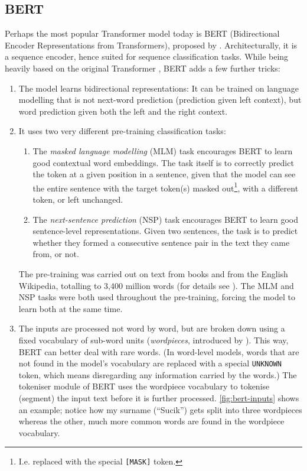 \documentclass[bsc,frontabs,twoside,singlespacing,parskip,deptreport]{infthesis}
\begin{document}
{{    \subsection{BERT}{
      \label{sec:BERT}
      Perhaps the most popular Transformer model today is BERT (Bidirectional Encoder Representations from Transformers), proposed by \citet{Devlin_2018}. Architecturally, it is a sequence encoder, hence suited for sequence classification tasks. While being heavily based on the original Transformer \citep{Vaswani_2017}, BERT adds a few further tricks:
      \begin{enumerate}
        \item The model learns bidirectional representations: It can be trained on language modelling that is not next-word prediction (prediction given left context), but word prediction given both the left and the right context.
        \item {It uses two very different pre-training classification tasks:
        \begin{enumerate}
          \item The \textit{masked language modelling} (MLM) task encourages BERT to learn good contextual word embeddings. The task itself is to correctly predict the token at a given position in a sentence, given that the model can see the entire sentence with the target token(s) masked out\footnote{I.e. replaced with the special \verb|[MASK]| token.}, with a different token, or left unchanged.
          \item The \textit{next-sentence prediction} (NSP) task encourages BERT to learn good sentence-level representations. Given two sentences, the task is to predict whether they formed a consecutive sentence pair in the text they came from, or not.
        \end{enumerate}
        The pre-training was carried out on text from books and from the English Wikipedia, totalling to 3,400 million words (for details see \citet{Devlin_2018}). The MLM and NSP tasks were both used throughout the pre-training, forcing the model to learn both at the same time.
        }
        \item The inputs are processed not word by word, but are broken down using a fixed vocabulary of sub-word units (\textit{wordpieces}, introduced by \citet{Wu_2016}). This way, BERT can better deal with rare words. (In word-level models, words that are not found in the model's vocabulary are replaced with a special \verb|UNKNOWN| token, which means disregarding any information carried by the words.) The tokeniser module of BERT uses the wordpiece vocabulary to tokenise (segment) the input text before it is further processed. \autoref{fig:bert-inputs} shows an example; notice how my surname (``Sucik'') gets split into three wordpieces whereas the other, much more common words are found in the wordpiece vocabulary.

\end{enumerate}}}}
\end{document}
